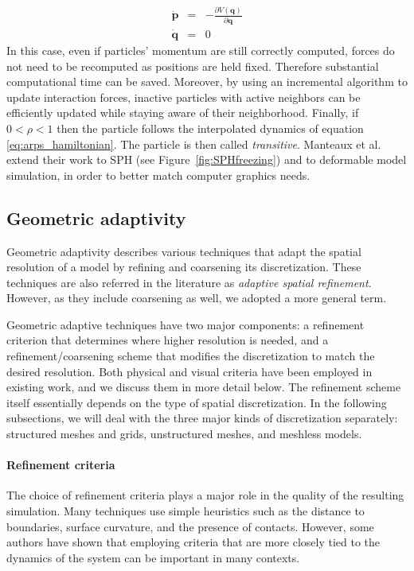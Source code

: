 \begin{equation}
\label{eq:no_motion}
\begin{array}{lll}
    \displaystyle \dot{\mathbf{p}} & = & \displaystyle - \frac{\partial V(\mathbf{q})}{\partial \mathbf{q}} \\
    \displaystyle \dot{\mathbf{q}} & = & 0
\end{array}
\end{equation}
In this case, even if particles' momentum are still correctly computed, forces do not need to be recomputed as positions are held fixed. Therefore substantial computational time can be saved. Moreover, by using an incremental algorithm to update interaction forces, inactive particles with active neighbors can be efficiently updated while staying aware of their neighborhood.
Finally, if $0<\rho<1$ then the particle follows the interpolated dynamics of equation \eqref{eq:arps_hamiltonian}. The particle is then called \emph{transitive}.
Manteaux et al. \cite{Manteaux2013} extend their work to SPH (see Figure~\ref{fig:SPHfreezing}) and to deformable model simulation, in order to better match computer graphics needs.

\subsection{Geometric adaptivity} \label{sec h adaptivity}
\label{sec:spatial_refinement}

Geometric adaptivity describes various techniques that adapt the spatial resolution of a model by refining and coarsening its discretization. These techniques are also referred in the literature as \emph{adaptive spatial refinement}. However, as they include coarsening as well, we adopted a more general term.

Geometric adaptive techniques have two major components: a refinement criterion that determines where higher resolution is needed, and a refinement/coarsening scheme that modifies the discretization to match the desired resolution.
Both physical and visual criteria have been employed in existing work, and we discuss them in more detail below.
The refinement scheme itself essentially depends on the type of spatial discretization.
In the following subsections, we will deal with the three major kinds of discretization separately: structured meshes and grids, unstructured meshes, and meshless models.


\paragraph*{Refinement criteria}
The choice of refinement criteria plays a major role in the quality of the resulting simulation.
Many techniques use simple heuristics such as the distance to boundaries, surface curvature, and the presence of contacts.
However, some authors have shown that employing criteria that are more closely tied to the dynamics of the system can be important in many contexts.

